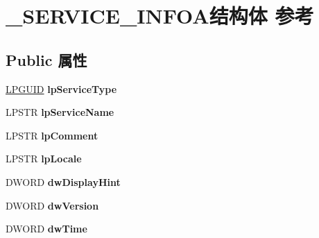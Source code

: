 \hypertarget{struct___s_e_r_v_i_c_e___i_n_f_o_a}{}\section{\+\_\+\+S\+E\+R\+V\+I\+C\+E\+\_\+\+I\+N\+F\+O\+A结构体 参考}
\label{struct___s_e_r_v_i_c_e___i_n_f_o_a}
\subsection*{Public 属性}
\begin{DoxyCompactItemize}
\item 
\mbox{\label{struct___s_e_r_v_i_c_e___i_n_f_o_a_acc3efedd112520c1e6f0cb43091bd0ae}} 
\hyperlink{interface_g_u_i_d}{L\+P\+G\+U\+ID} {\bfseries lp\+Service\+Type}
\item 
\mbox{\label{struct___s_e_r_v_i_c_e___i_n_f_o_a_ac73eec28d78686715656b76a381a10cb}} 
L\+P\+S\+TR {\bfseries lp\+Service\+Name}
\item 
\mbox{\label{struct___s_e_r_v_i_c_e___i_n_f_o_a_a7f4274dbad2df0c6d4d90bfc53e72690}} 
L\+P\+S\+TR {\bfseries lp\+Comment}
\item 
\mbox{\label{struct___s_e_r_v_i_c_e___i_n_f_o_a_a959e2c7246f265918b8a05acfc3cfafc}} 
L\+P\+S\+TR {\bfseries lp\+Locale}
\item 
\mbox{\label{struct___s_e_r_v_i_c_e___i_n_f_o_a_a48febfd07ed40d764832ba2dd9a14195}} 
D\+W\+O\+RD {\bfseries dw\+Display\+Hint}
\item 
\mbox{\label{struct___s_e_r_v_i_c_e___i_n_f_o_a_a80bcc078fcaee26a49ae9e18deb964b6}} 
D\+W\+O\+RD {\bfseries dw\+Version}
\item 
\mbox{\label{struct___s_e_r_v_i_c_e___i_n_f_o_a_a97267193ced4b55331e726495a9d66ec}} 
D\+W\+O\+RD {\bfseries dw\+Time}
\item 
\mbox{\label{struct___s_e_r_v_i_c_e___i_n_f_o_a_adf00d928cedccddbbad06cb7665fcc4d}} 

\end{DoxyCompactItemize}
